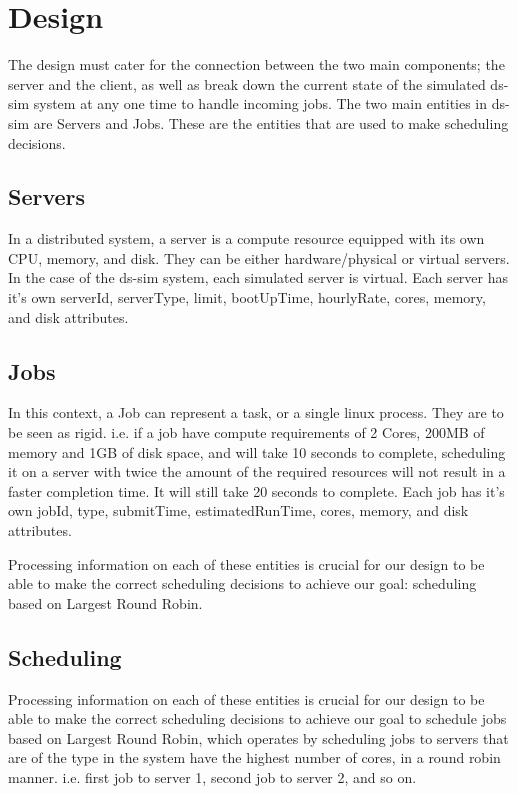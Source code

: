 \documentclass[a4paper]{article}
\begin{document}
\section{Design}
\label{sec:section3}
The design must cater for the connection between the two main components; the server and the client, as well as break down the current state of the simulated ds-sim system at any one time to handle incoming jobs. The two main entities in ds-sim are Servers and Jobs. These are the entities that are used to make scheduling decisions.

\subsection{Servers}
In a distributed system, a server is a compute resource equipped with its own CPU, memory, and disk. They can be either hardware/physical or virtual servers. In the case of the ds-sim system, each simulated server is virtual. Each server has it's own serverId, serverType, limit, bootUpTime, hourlyRate, cores, memory, and disk attributes.

\subsection{Jobs}
In this context, a Job can represent a task, or a single linux process. They are to be seen as rigid. i.e. if a job have compute requirements of 2 Cores, 200MB of memory and 1GB of disk space, and will take 10 seconds to complete, scheduling it on a server with twice the amount of the required resources will not result in a faster completion time. It will still take 20 seconds to complete. Each job has it's own jobId, type, submitTime, estimatedRunTime, cores, memory, and disk attributes.

Processing information on each of these entities is crucial for our design to be able to make the correct scheduling decisions to achieve our goal: scheduling based on Largest Round Robin.

\subsection{Scheduling}
Processing information on each of these entities is crucial for our design to be able to make the correct scheduling decisions to achieve our goal to schedule jobs based on Largest Round Robin, which operates by scheduling jobs to servers that are of the type in the system have the highest number of cores, in a round robin manner. i.e. first job to server 1, second job to server 2, and so on.
\end{document}
